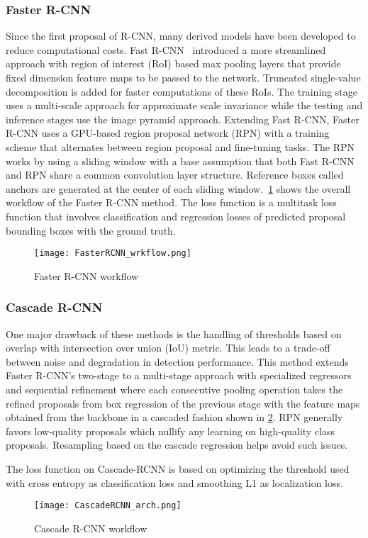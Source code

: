 \subsubsection{Faster R-CNN}
\label{subsubsec: Faster R-CNN}

Since the first proposal of R-CNN, many derived models have been developed to reduce computational costs. Fast R-CNN~\cite{2015Ross} introduced a more streamlined approach with region of interest (RoI) based max pooling layers that provide fixed dimension feature maps to be passed to the network. Truncated single-value decomposition is added for faster computations of these RoIs. The training stage uses a multi-scale approach for approximate scale invariance while the testing and inference stages use the image pyramid approach. Extending Fast R-CNN, Faster R-CNN uses a GPU-based region proposal network (RPN) with a training scheme that alternates between region proposal and fine-tuning tasks. The RPN works by using a sliding window with a base assumption that both Fast R-CNN and RPN share a common convolution layer structure. Reference boxes called anchors are generated at the center of each sliding window.~\cref{fig:fasterrcnn} shows the overall workflow of the Faster R-CNN method. The loss function is a multitask loss function that involves classification and regression losses of predicted proposal bounding boxes with the ground truth.

\begin{figure}[!htb]
\centering
\texttt{[image: FasterRCNN\_wrkflow.png]}
\caption{Faster R-CNN workflow}
\label{fig:fasterrcnn}
\end{figure}


\subsubsection{Cascade R-CNN}
\label{subsubsec: Cascade R-CNN}

One major drawback of these methods is the handling of thresholds based on overlap with intersection over union (IoU) metric. This leads to a trade-off between noise and degradation in detection performance. This method extends Faster R-CNN's two-stage to a multi-stage approach with specialized regressors and sequential refinement where each consecutive pooling operation takes the refined proposals from box regression of the previous stage with the feature maps obtained from the backbone in a cascaded fashion shown in \cref{fig:cascadercnn}. RPN generally favors low-quality proposals which nullify any learning on high-quality class proposals. Resampling based on the cascade regression helps avoid such issues. 

The loss function on Cascade-RCNN is based on optimizing the threshold used with cross entropy as classification loss and smoothing L1 as localization loss.

\begin{figure}[!htb]
\centering
\texttt{[image: CascadeRCNN\_arch.png]}
\caption{Cascade R-CNN workflow}
\label{fig:cascadercnn}
\end{figure}